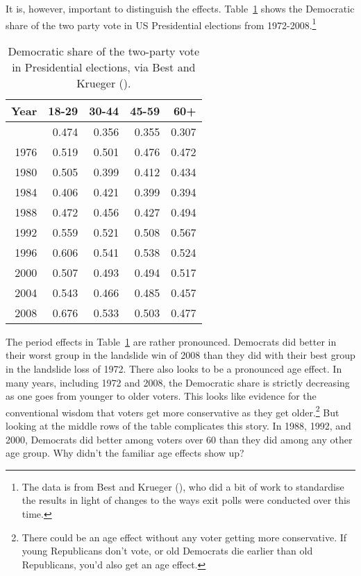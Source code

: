 \documentclass[
  10pt,
  letterpaper,
  DIV=11,
  numbers=noendperiod,
  twoside]{scrartcl}
\begin{document}
It is, however, important to distinguish the effects.
Table~\ref{tbl-presidential} shows the Democratic share of the two party
vote in US Presidential elections from 1972-2008.\footnote{The data is
  from Best and Krueger (), who did
  a bit of work to standardise the results in light of changes to the
  ways exit polls were conducted over this time.}

\begin{longtable}[]{@{}rrrrr@{}}

\caption{\label{tbl-presidential}Democratic share of the two-party vote
in Presidential elections, via Best and Krueger
().}

\tabularnewline

\toprule\noalign{}
Year & 18-29 & 30-44 & 45-59 & 60+ \\
\midrule\noalign{}
\endhead
\bottomrule\noalign{}
\endlastfoot
1972 & 0.474 & 0.356 & 0.355 & 0.307 \\
1976 & 0.519 & 0.501 & 0.476 & 0.472 \\
1980 & 0.505 & 0.399 & 0.412 & 0.434 \\
1984 & 0.406 & 0.421 & 0.399 & 0.394 \\
1988 & 0.472 & 0.456 & 0.427 & 0.494 \\
1992 & 0.559 & 0.521 & 0.508 & 0.567 \\
1996 & 0.606 & 0.541 & 0.538 & 0.524 \\
2000 & 0.507 & 0.493 & 0.494 & 0.517 \\
2004 & 0.543 & 0.466 & 0.485 & 0.457 \\
2008 & 0.676 & 0.533 & 0.503 & 0.477 \\

\end{longtable}

The period effects in Table~\ref{tbl-presidential} are rather
pronounced. Democrats did better in their worst group in the landslide
win of 2008 than they did with their best group in the landslide loss of
1972. There also looks to be a pronounced age effect. In many years,
including 1972 and 2008, the Democratic share is strictly decreasing as
one goes from younger to older voters. This looks like evidence for the
conventional wisdom that voters get more conservative as they get
older.\footnote{There could be an age effect without any voter getting
  more conservative. If young Republicans don't vote, or old Democrats
  die earlier than old Republicans, you'd also get an age effect.} But
looking at the middle rows of the table complicates this story. In 1988,
1992, and 2000, Democrats did better among voters over 60 than they did
among any other age group. Why didn't the familiar age effects show up?
\end{document}
